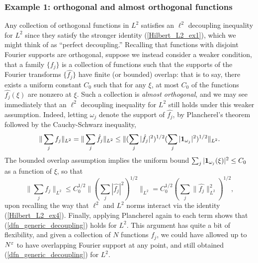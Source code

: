 \documentclass[brochure,english,12pt]{bourbaki}%
\begin{document}
 
 \subsubsection{Example 1: orthogonal and almost orthogonal functions}\label{sec_almost_orthogonal_example}
Any collection of orthogonal functions in $L^2$ satisfies an $\ell^2$ decoupling inequality for $L^2$ since they satisfy the stronger identity (\ref{Hilbert_L2_ex1}), which we might think of as ``perfect decoupling.'' 
Recalling that functions with disjoint Fourier supports are orthogonal, suppose we instead consider a weaker condition, that a family $\{f_j\}$ is a collection of functions such that the supports of the Fourier transforms $\{ \hat{f_j}\}$  have finite (or bounded) overlap: that is to say, there exists a uniform constant $C_0$ such that for any $\xi$, at most $C_0$ of the functions $\hat{f_j}(\xi)$ are nonzero at $\xi$. Such a collection is  \emph{almost orthogonal}, and we may see immediately that an $\ell^2$ decoupling inequality for $L^2$ still holds under this weaker assumption. Indeed, letting $\omega_j$ denote the support of $\hat{f_j}$, by Plancherel's theorem followed by the Cauchy-Schwarz inequality,
\[ \| \sum_j f_j \|_{L^2} = \| \sum_j \hat{f_j} \|_{L^2} \leq \|  ( \sum_j |\hat{f_j}|^2)^{1/2} ( \sum_j |\boldsymbol1_{\omega_j}|^2)^{1/2}  \|_{L^2}. \]
The bounded overlap assumption implies the uniform bound $\sum_j |\boldsymbol1_{\omega_j}(\xi)|^2 \leq C_0$ as a function of $\xi$, 
so that 
\[ \| \sum_j f_j \|_{L^2}  \leq  C_0^{1/2} \|  ( \sum_j |\hat{f_j}|^2)^{1/2} \|_{L^2} = C_0^{1/2}( \sum_j \|\hat{f_j} \|^2_{L^2} )^{1/2},\]
upon recalling the way that $\ell^2$ and $L^2$ norms interact via the identity (\ref{Hilbert_L2_ex4}). Finally, applying Plancherel again to each term shows that (\ref{dfn_generic_decoupling}) holds for $L^2$. This argument has quite a bit of flexibility, and given a collection of $N$ functions $f_j$, we could have allowed up to $N^\varepsilon$ to have overlapping Fourier support at any point, and still obtained (\ref{dfn_generic_decoupling}) for $L^2$.
\end{document}
